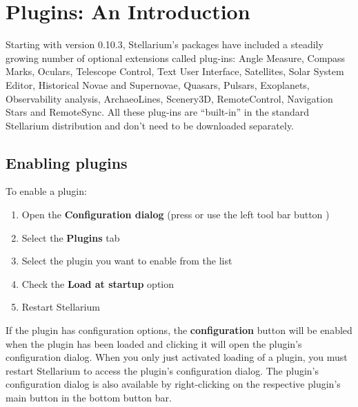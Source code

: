 
\chapter{Plugins: An Introduction}
\label{ch:Plugins}

Starting with version 0.10.3, Stellarium's packages have included a steadily growing number of
optional extensions called plug-ins: Angle Measure, Compass Marks, Oculars, Telescope Control, Text
User Interface, Satellites, Solar System Editor, Historical Novae and
Supernovae, Quasars, Pulsars, Exoplanets, Observability analysis, ArchaeoLines, Scenery3D,
RemoteControl, Navigation Stars and RemoteSync. All
these plug-ins are ``built-in'' in the standard Stellarium distribution
and don't need to be downloaded separately.


\section{Enabling plugins}
\label{sec:Plugins:EnablingPlugins}


To enable a plugin:

\begin{enumerate}
\item Open the \textbf{Configuration dialog} (press  or use
  the left tool bar button )
\item Select the \textbf{Plugins} tab
\item Select the plugin you want to enable from the list
\item Check the \textbf{Load at startup} option
\item Restart Stellarium
\end{enumerate}

\noindent If the plugin has configuration options, the
\textbf{configuration} button will be enabled when the plugin has been
loaded and clicking it will open the plugin's configuration
dialog. When you only just activated loading of a plugin, you must
restart Stellarium to access the plugin's configuration dialog.  The
plugin's configuration dialog  is also available by
right-clicking on the respective plugin's main button in the bottom
button bar.

